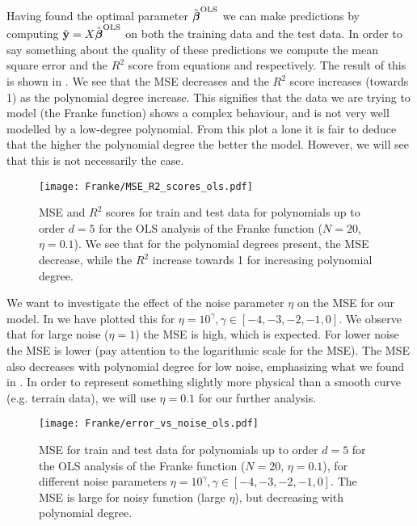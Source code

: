             Having found the optimal parameter $\hat{\boldsymbol{\beta}}^{\text{OLS}}$ we can make predictions by computing $\tilde{\mathbf{y}} = X\hat{\boldsymbol{\beta}}^{\text{OLS}}$ on both the training data and the test data. In order to say something about the quality of these predictions we compute the mean square error and the $R^2$ score from equations  and  respectively. The result of this is shown in . We see that the MSE decreases and the $R^2$ score increases (towards 1) as the polynomial degree increase. This signifies that the data we are trying to model (the Franke function) shows a complex behaviour, and is not very well modelled by a low-degree polynomial. From this plot a lone it is fair to deduce that the higher the polynomial degree the better the model. However, we will see that this is not necessarily the case. 

            \begin{figure}
                \texttt{[image: Franke/MSE\_R2\_scores\_ols.pdf]}
                \caption{MSE and $R^2$ scores for train and test data for polynomials up to order $d=5$ for the OLS analysis of the Franke function ($N=20$, $\eta=0.1$). We  see that for the polynomial degrees present, the MSE decrease, while the $R^2$ increase towards 1 for increasing polynomial  degree. }
                \label{fig:mse_and_r2_for_order5}
            \end{figure}
            
            
            We want to investigate the effect of the noise parameter $\eta$ on the MSE for our model. In  we have plotted this for $\eta = 10^{\gamma}, \gamma\in[-4,-3,-2,-1,0]$. We observe that for large noise ($\eta=1$) the MSE is high, which is expected. For lower noise the MSE is lower (pay attention to the logarithmic scale for the MSE). The MSE also decreases with polynomial degree for low noise, emphasizing what we found in . In order to represent something slightly more physical than a smooth curve (e.g. terrain data), we will use $\eta=0.1$ for our further analysis. 

            \begin{figure}
                \texttt{[image: Franke/error\_vs\_noise\_ols.pdf]}
                \caption{MSE for train and test data for polynomials up to order $d=5$ for the OLS analysis of the Franke function ($N=20$, $\eta=0.1$), for different noise parameters $\eta = 10^{\gamma}, \gamma\in[-4,-3,-2,-1,0]$. The MSE is large for noisy function (large $\eta$), but decreasing with polynomial degree.}
                \label{fig:mse_for_different_noise_ols}
            \end{figure}


